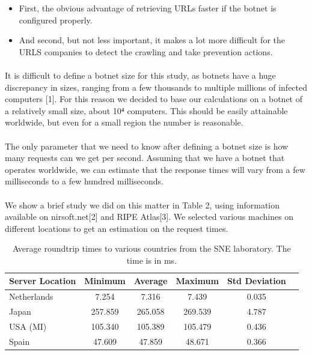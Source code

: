 \documentclass[12pt]{article}
\begin{document}
\begin{itemize}

\item  First, the obvious advantage of retrieving URLs faster if the botnet is configured properly.

\item  And second, but not less important, it makes a lot more difficult for the URLS companies to detect the crawling and take prevention actions.

\end{itemize}

\paragraph{}
It is difficult to define a botnet size for this study, as botnets have a huge discrepancy in sizes, ranging from a few thousands to multiple millions of infected computers [1]. For this reason we decided to base our calculations on a botnet of a relatively small size, about 10⁴ computers. This should be easily attainable worldwide, but even for a small region the number is reasonable.

\paragraph{}
The only parameter that we need to know after defining a botnet size is how many requests can we get per second. Assuming that we have a botnet that operates worldwide, we can estimate that the response times will vary from a few milliseconds to a few hundred milliseconds.

\paragraph{}
We show a brief study we did on this matter in Table 2, using information available on nirsoft.net[2] and RIPE Atlas[3]. We selected various machines on different locations to get an estimation on the request times.

\begin{table}[h]
	
		\begin{tabular}{|l|c|c|c|c|c|}
  			\hline
	  		\textbf{Server Location} & \textbf{Minimum} & \textbf{Average} & \textbf{Maximum} & \textbf{Std Deviation} \\
	  		\hline
  			Netherlands & 7.254 & 7.316 & 7.439 & 0.035 \\ 
  			\hline
  			Japan & 257.859 & 265.058 & 269.539 & 4.787 \\
	  		\hline
  			USA (MI) & 105.340 & 105.389 & 105.479 & 0.436 \\
  			\hline
  			Spain & 47.609 & 47.859 & 48.671 & 0.366 \\
  			\hline
		\end{tabular}
	\caption[A table]{Average roundtrip times to various countries from the SNE laboratory. The time is in ms.}
\end{table}
\end{document}
